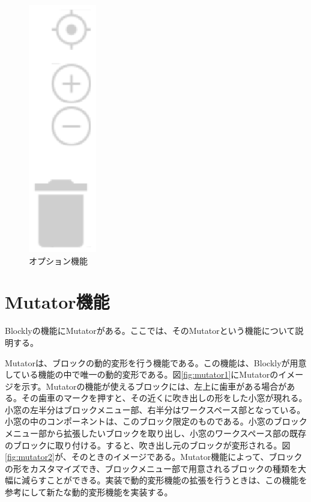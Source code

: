 \documentclass{eniepaper}
\begin{document}
\begin{figure}[h]
\begin{center}
\includegraphics[scale=0.5]{img/blockly_option.eps}
\caption{オプション機能}%
\label{fig:blockly_option}
\end{center}%
\end{figure}%


   \section{Mutator機能}
   
Blocklyの機能にMutatorがある。ここでは、そのMutatorという機能について説明する。

Mutatorは、ブロックの動的変形を行う機能である。この機能は、Blocklyが用意している機能の中で唯一の動的変形である。図\ref{fig:mutator1}にMutatorのイメージを示す。Mutatorの機能が使えるブロックには、左上に歯車がある場合がある。その歯車のマークを押すと、その近くに吹き出しの形をした小窓が現れる。小窓の左半分はブロックメニュー部、右半分はワークスペース部となっている。小窓の中のコンポーネントは、このブロック限定のものである。小窓のブロックメニュー部から拡張したいブロックを取り出し、小窓のワークスペース部の既存のブロックに取り付ける。すると、吹き出し元のブロックが変形される。図\ref{fig:mutator2}が、そのときのイメージである。Mutator機能によって、ブロックの形をカスタマイズでき、ブロックメニュー部で用意されるブロックの種類を大幅に減らすことができる。実装で動的変形機能の拡張を行うときは、この機能を参考にして新たな動的変形機能を実装する。
\end{document}
